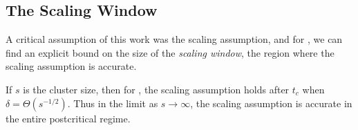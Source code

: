 \documentclass[twoside,10pt]{article}
\begin{document}
\subsection{The Scaling Window}

A critical assumption of this work was the scaling assumption, and for \ER, we can find an explicit bound on the size of the \textit{scaling window}, the region where the scaling assumption is accurate.

\begin{thrm}[]
	\label{crit-window}
	If $s$ is the cluster size, then for \ER, the scaling assumption holds after $t_{c}$ when $\delta = \Theta(s^{-1/2})$. Thus in the limit as $s\to \infty$, the scaling assumption is accurate in the entire postcritical regime.
\end{thrm}
\end{document}
